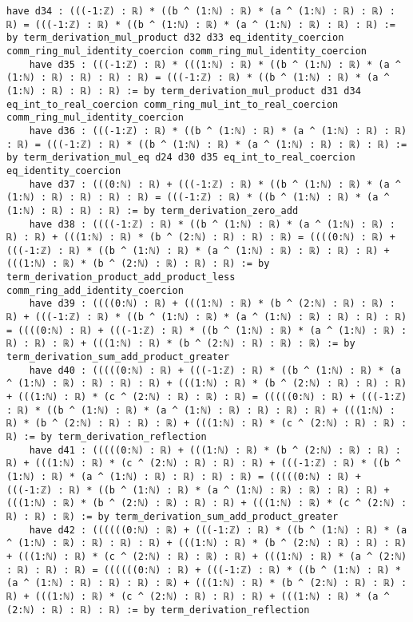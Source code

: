 \documentclass{article}
\begin{document}
\begin{tcolorbox}[colback=white!10, width=\linewidth]
\begin{lstlisting}[language=Lean4]
    have d34 : (((-1:ℤ) : ℝ) * ((b ^ (1:ℕ) : ℝ) * (a ^ (1:ℕ) : ℝ) : ℝ) : ℝ) = (((-1:ℤ) : ℝ) * ((b ^ (1:ℕ) : ℝ) * (a ^ (1:ℕ) : ℝ) : ℝ) : ℝ) := by term_derivation_mul_product d32 d33 eq_identity_coercion comm_ring_mul_identity_coercion comm_ring_mul_identity_coercion
    have d35 : (((-1:ℤ) : ℝ) * (((1:ℕ) : ℝ) * ((b ^ (1:ℕ) : ℝ) * (a ^ (1:ℕ) : ℝ) : ℝ) : ℝ) : ℝ) = (((-1:ℤ) : ℝ) * ((b ^ (1:ℕ) : ℝ) * (a ^ (1:ℕ) : ℝ) : ℝ) : ℝ) := by term_derivation_mul_product d31 d34 eq_int_to_real_coercion comm_ring_mul_int_to_real_coercion comm_ring_mul_identity_coercion
    have d36 : (((-1:ℤ) : ℝ) * ((b ^ (1:ℕ) : ℝ) * (a ^ (1:ℕ) : ℝ) : ℝ) : ℝ) = (((-1:ℤ) : ℝ) * ((b ^ (1:ℕ) : ℝ) * (a ^ (1:ℕ) : ℝ) : ℝ) : ℝ) := by term_derivation_mul_eq d24 d30 d35 eq_int_to_real_coercion eq_identity_coercion
    have d37 : (((0:ℕ) : ℝ) + (((-1:ℤ) : ℝ) * ((b ^ (1:ℕ) : ℝ) * (a ^ (1:ℕ) : ℝ) : ℝ) : ℝ) : ℝ) = (((-1:ℤ) : ℝ) * ((b ^ (1:ℕ) : ℝ) * (a ^ (1:ℕ) : ℝ) : ℝ) : ℝ) := by term_derivation_zero_add
    have d38 : ((((-1:ℤ) : ℝ) * ((b ^ (1:ℕ) : ℝ) * (a ^ (1:ℕ) : ℝ) : ℝ) : ℝ) + (((1:ℕ) : ℝ) * (b ^ (2:ℕ) : ℝ) : ℝ) : ℝ) = ((((0:ℕ) : ℝ) + (((-1:ℤ) : ℝ) * ((b ^ (1:ℕ) : ℝ) * (a ^ (1:ℕ) : ℝ) : ℝ) : ℝ) : ℝ) + (((1:ℕ) : ℝ) * (b ^ (2:ℕ) : ℝ) : ℝ) : ℝ) := by term_derivation_product_add_product_less comm_ring_add_identity_coercion
    have d39 : ((((0:ℕ) : ℝ) + (((1:ℕ) : ℝ) * (b ^ (2:ℕ) : ℝ) : ℝ) : ℝ) + (((-1:ℤ) : ℝ) * ((b ^ (1:ℕ) : ℝ) * (a ^ (1:ℕ) : ℝ) : ℝ) : ℝ) : ℝ) = ((((0:ℕ) : ℝ) + (((-1:ℤ) : ℝ) * ((b ^ (1:ℕ) : ℝ) * (a ^ (1:ℕ) : ℝ) : ℝ) : ℝ) : ℝ) + (((1:ℕ) : ℝ) * (b ^ (2:ℕ) : ℝ) : ℝ) : ℝ) := by term_derivation_sum_add_product_greater
    have d40 : (((((0:ℕ) : ℝ) + (((-1:ℤ) : ℝ) * ((b ^ (1:ℕ) : ℝ) * (a ^ (1:ℕ) : ℝ) : ℝ) : ℝ) : ℝ) + (((1:ℕ) : ℝ) * (b ^ (2:ℕ) : ℝ) : ℝ) : ℝ) + (((1:ℕ) : ℝ) * (c ^ (2:ℕ) : ℝ) : ℝ) : ℝ) = (((((0:ℕ) : ℝ) + (((-1:ℤ) : ℝ) * ((b ^ (1:ℕ) : ℝ) * (a ^ (1:ℕ) : ℝ) : ℝ) : ℝ) : ℝ) + (((1:ℕ) : ℝ) * (b ^ (2:ℕ) : ℝ) : ℝ) : ℝ) + (((1:ℕ) : ℝ) * (c ^ (2:ℕ) : ℝ) : ℝ) : ℝ) := by term_derivation_reflection
    have d41 : (((((0:ℕ) : ℝ) + (((1:ℕ) : ℝ) * (b ^ (2:ℕ) : ℝ) : ℝ) : ℝ) + (((1:ℕ) : ℝ) * (c ^ (2:ℕ) : ℝ) : ℝ) : ℝ) + (((-1:ℤ) : ℝ) * ((b ^ (1:ℕ) : ℝ) * (a ^ (1:ℕ) : ℝ) : ℝ) : ℝ) : ℝ) = (((((0:ℕ) : ℝ) + (((-1:ℤ) : ℝ) * ((b ^ (1:ℕ) : ℝ) * (a ^ (1:ℕ) : ℝ) : ℝ) : ℝ) : ℝ) + (((1:ℕ) : ℝ) * (b ^ (2:ℕ) : ℝ) : ℝ) : ℝ) + (((1:ℕ) : ℝ) * (c ^ (2:ℕ) : ℝ) : ℝ) : ℝ) := by term_derivation_sum_add_product_greater
    have d42 : ((((((0:ℕ) : ℝ) + (((-1:ℤ) : ℝ) * ((b ^ (1:ℕ) : ℝ) * (a ^ (1:ℕ) : ℝ) : ℝ) : ℝ) : ℝ) + (((1:ℕ) : ℝ) * (b ^ (2:ℕ) : ℝ) : ℝ) : ℝ) + (((1:ℕ) : ℝ) * (c ^ (2:ℕ) : ℝ) : ℝ) : ℝ) + (((1:ℕ) : ℝ) * (a ^ (2:ℕ) : ℝ) : ℝ) : ℝ) = ((((((0:ℕ) : ℝ) + (((-1:ℤ) : ℝ) * ((b ^ (1:ℕ) : ℝ) * (a ^ (1:ℕ) : ℝ) : ℝ) : ℝ) : ℝ) + (((1:ℕ) : ℝ) * (b ^ (2:ℕ) : ℝ) : ℝ) : ℝ) + (((1:ℕ) : ℝ) * (c ^ (2:ℕ) : ℝ) : ℝ) : ℝ) + (((1:ℕ) : ℝ) * (a ^ (2:ℕ) : ℝ) : ℝ) : ℝ) := by term_derivation_reflection

\end{lstlisting}
\end{tcolorbox}
\end{document}

